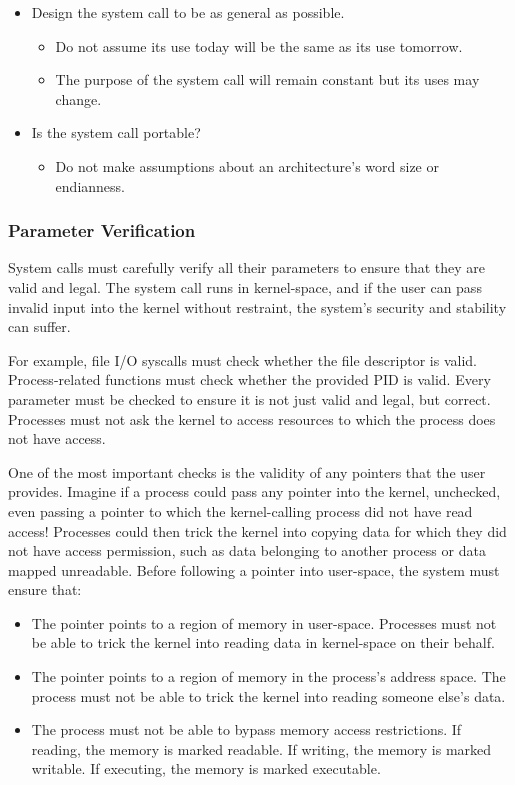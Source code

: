 \begin{itemize}[noitemsep]
\item Design the system call to be as general as possible.
  \begin{itemize}[noitemsep]
  \item Do not assume its use today will be the same as its use tomorrow.
  \item The purpose of the system call will remain constant but its uses may change.
  \end{itemize}

\item Is the system call portable?
  \begin{itemize}[noitemsep]
  \item Do not make assumptions about an architecture’s word size or endianness.
  \end{itemize}
\end{itemize}

\subsubsection{Parameter Verification}\label{subsubsec:Parameter_Verification}
System calls must carefully verify all their parameters to ensure that they are valid and legal.
The system call runs in kernel-space, and if the user can pass invalid input into the kernel without restraint, the system’s security and stability can suffer.

For example, file I/O syscalls must check whether the file descriptor is valid.
Process-related functions must check whether the provided PID is valid.
Every parameter must be checked to ensure it is not just valid and legal, but correct.
Processes must not ask the kernel to access resources to which the process does not have access.

One of the most important checks is the validity of any pointers that the user provides.
Imagine if a process could pass any pointer into the kernel, unchecked, even passing a pointer to which the kernel-calling process did not have read access!
Processes could then trick the kernel into copying data for which they did not have access permission, such as data belonging to another process or data mapped unreadable.
Before following a pointer into user-space, the system must ensure that:
\begin{itemize}[noitemsep]
\item The pointer points to a region of memory in user-space.
  Processes must not be able to trick the kernel into reading data in kernel-space on their behalf.
\item The pointer points to a region of memory in the process’s address space.
  The process must not be able to trick the kernel into reading someone else’s data.
\item The process must not be able to bypass memory access restrictions.
  If reading, the memory is marked readable.
  If writing, the memory is marked writable.
  If executing, the memory is marked executable.
\end{itemize}

